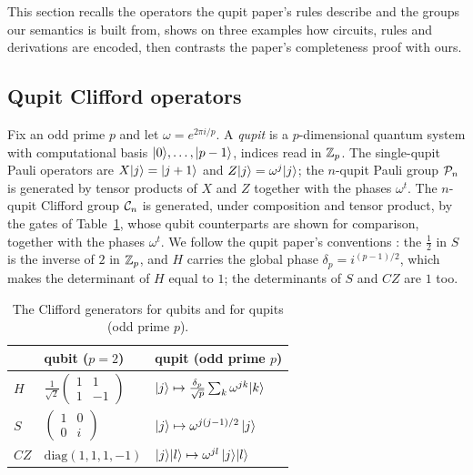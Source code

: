 This section recalls the operators the qupit paper's rules describe and
the groups our semantics is built from, shows on three examples how
circuits, rules and derivations are encoded, then contrasts the
paper's completeness proof with ours.

\subsection{Qupit Clifford operators}\label{sec:operators}

Fix an odd prime $p$ and let $\omega = e^{2\pi i/p}$.  A \emph{qupit} is
a $p$-dimensional quantum system with computational basis
$|0\rangle,\dots,|p-1\rangle$, indices read in $\mathbb{Z}_p$.  The single-qupit Pauli
operators are $X|j\rangle = |j+1\rangle$ and $Z|j\rangle = \omega^{j}|j\rangle$;
the $n$-qupit Pauli group $\mathcal{P}_{n}$ is generated by tensor products of $X$
and $Z$ together with the phases $\omega^t$.  The $n$-qupit Clifford
group $\mathcal{C}_{n}$ is generated, under composition and tensor product, by the
gates of Table~\ref{tab:gates}, whose qubit counterparts are shown for
comparison, together with the phases $\omega^t$.  We follow the qupit paper's conventions
\cite{bian2026qudit}: the $\tfrac12$ in $S$ is the inverse of $2$ in
$\mathbb{Z}_p$, and $H$ carries the global phase $\delta_p = i^{(p-1)/2}$, which
makes the determinant of $H$ equal to $1$; the determinants of $S$ and
$CZ$ are $1$ too.

\begin{table}[h]
\caption{The Clifford generators for qubits and for qupits (odd prime $p$).}
\label{tab:gates}
\centering
\begin{tabular}{lll}
\toprule
 & qubit ($p = 2$) & qupit (odd prime $p$) \\
\midrule
$H$  & $\frac{1}{\sqrt2}\begin{pmatrix}1&1\\1&-1\end{pmatrix}$
     & $|j\rangle \mapsto \tfrac{\delta_p}{\sqrt p}\sum_k \omega^{jk}|k\rangle$ \\[2ex]
$S$  & $\begin{pmatrix}1&0\\0&i\end{pmatrix}$
     & $|j\rangle \mapsto \omega^{j(j-1)/2}\,|j\rangle$ \\[2ex]
$CZ$ & $\mathrm{diag}(1,1,1,-1)$
     & $|j\rangle|l\rangle \mapsto \omega^{jl}\,|j\rangle|l\rangle$ \\
\bottomrule
\end{tabular}
\end{table}

